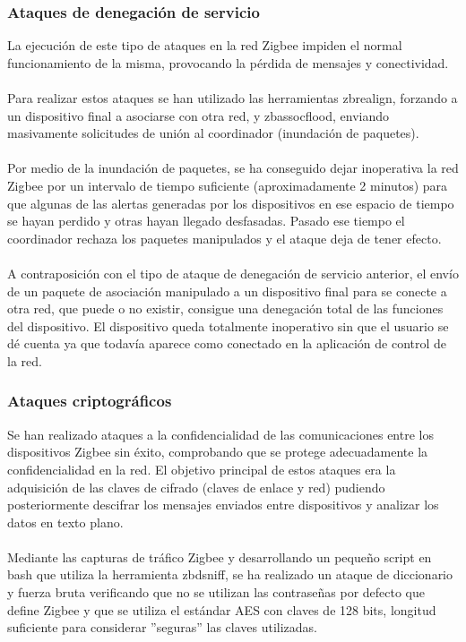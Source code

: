 \subsubsection{Ataques de denegación de servicio} %
La ejecución de este tipo de ataques en la red Zigbee impiden el normal funcionamiento de la misma, provocando la pérdida de mensajes y conectividad.
\\\\
Para realizar estos ataques se han utilizado las herramientas zbrealign, forzando a un dispositivo final a asociarse con otra red, y zbassocflood, enviando masivamente solicitudes de unión al coordinador (inundación de paquetes).
\\\\
Por medio de la inundación de paquetes, se ha conseguido dejar inoperativa la red Zigbee por un intervalo de tiempo suficiente (aproximadamente 2 minutos) para que algunas de las alertas generadas por los dispositivos en ese espacio de tiempo se hayan perdido y otras hayan llegado desfasadas. Pasado ese tiempo el coordinador rechaza los paquetes manipulados y el ataque deja de tener efecto.
\\\\A contraposición con el tipo de ataque de denegación de servicio anterior, el envío de un paquete de asociación manipulado a un dispositivo final para se conecte a otra red, que puede o no existir, consigue una denegación total de las funciones del dispositivo. El dispositivo queda totalmente inoperativo sin que el usuario se dé cuenta ya que todavía aparece como conectado en la aplicación de control de la red.
\vspace{1cm}
\subsubsection{Ataques criptográficos} %
Se han realizado ataques a la confidencialidad de las comunicaciones entre los dispositivos Zigbee sin éxito, comprobando que se protege adecuadamente la confidencialidad en la red. El objetivo principal de estos ataques era la adquisición de las claves de cifrado (claves de enlace y red) pudiendo posteriormente descifrar los mensajes enviados entre dispositivos y analizar los datos en texto plano.
\\\\Mediante las capturas de tráfico Zigbee y desarrollando un pequeño script en bash que utiliza la herramienta zbdsniff, se ha realizado un ataque de diccionario y fuerza bruta verificando que no se utilizan las contraseñas por defecto que define Zigbee y que se utiliza el estándar AES con claves de 128 bits, longitud suficiente para considerar ''seguras'' las claves utilizadas.

